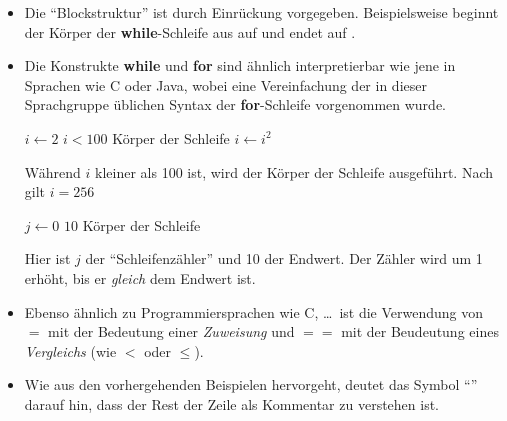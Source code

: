 \begin{itemize}
    \item Die \enquote{Blockstruktur} ist durch Einrückung vorgegeben. Beispielsweise beginnt der Körper der \textbf{while}-Schleife aus  auf  und endet auf .
    
    \item Die Konstrukte \textbf{while} und \textbf{for} sind ähnlich interpretierbar wie jene in Sprachen wie C oder Java, wobei eine Vereinfachung der in dieser Sprachgruppe üblichen Syntax der \textbf{for}-Schleife vorgenommen wurde.

    \begin{minipage}[t]{0.48\linewidth}
        \begin{codebox}
            \li $i \gets 2$
            \li \While $i < 100$
            \li     \Do
                        \Comment Körper der Schleife
            \li         $i \gets i^2$
            \li     \End                            \label{ln:pseudocode-example-while-end}
        \end{codebox}
        
        Während $i$ kleiner als 100 ist, wird der Körper der Schleife ausgeführt. Nach  gilt $i = 256$ 
    \end{minipage}
    \hfill
    \begin{minipage}[t]{0.48\linewidth}
        \begin{codebox}
            \li \For $j \gets 0$ \To $10$
            \li     \Do
                        \Comment Körper der Schleife
                    \End
        \end{codebox}

        Hier ist $j$ der \enquote{Schleifenzähler} und 10 der Endwert. Der Zähler wird um 1 erhöht, bis er \emph{gleich} dem Endwert ist.
    \end{minipage}

    \item Ebenso ähnlich zu Programmiersprachen wie C, \ldots\ ist die Verwendung von $=$ mit der Bedeutung einer \emph{Zuweisung} und $==$ mit der Beudeutung eines \emph{Vergleichs} (wie $<$ oder $\leq$).

    \item Wie aus den vorhergehenden Beispielen hervorgeht, deutet das Symbol \enquote{\Comment} darauf hin, dass der Rest der Zeile als Kommentar zu verstehen ist.
    

\end{itemize}
